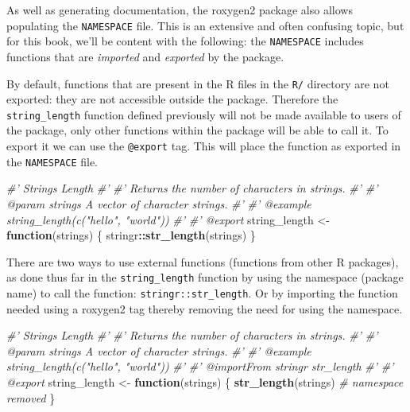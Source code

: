 \documentclass[10pt,]{krantz}
\makeatletter
\newenvironment{Shaded}{\begin{snugshade}}{\end{snugshade}}
\newcommand{\CommentTok}[1]{\textcolor[rgb]{0.37,0.37,0.37}{\textit{#1}}}
\newcommand{\ControlFlowTok}[1]{\textcolor[rgb]{0.27,0.27,0.27}{\textbf{#1}}}
\newcommand{\KeywordTok}[1]{\textcolor[rgb]{0.27,0.27,0.27}{\textbf{#1}}}
\newcommand{\NormalTok}[1]{#1}
\newcommand{\OperatorTok}[1]{\textcolor[rgb]{0.43,0.43,0.43}{\textbf{#1}}}
\newcommand{\StringTok}[1]{\textcolor[rgb]{0.5,0.5,0.5}{#1}}
\newenvironment{kframe}{%
\medskip{}
\setlength{\fboxsep}{.8em}
 \def\at@end@of@kframe{}%
 \ifinner\ifhmode%
  \def\at@end@of@kframe{\end{minipage}}%
  \begin{minipage}{\columnwidth}%
 \fi\fi%
 \def\FrameCommand##1{\hskip\@totalleftmargin \hskip-\fboxsep
 \colorbox{shadecolor}{##1}\hskip-\fboxsep
     \hskip-\linewidth \hskip-\@totalleftmargin \hskip\columnwidth}%
 \MakeFramed {\advance\hsize-\width
   \@totalleftmargin\z@ \linewidth\hsize
   \@setminipage}}%
 {\par\unskip\endMakeFramed%
 \at@end@of@kframe}
\renewenvironment{Shaded}{\begin{kframe}}{\end{kframe}}
\makeatother
\begin{document}
As well as generating documentation, the roxygen2 package also allows populating the \texttt{NAMESPACE} file. This is an extensive and often confusing topic, but for this book, we'll be content with the following: the \texttt{NAMESPACE} includes functions that are \emph{imported} and \emph{exported} by the package.

By default, functions that are present in the R files in the \texttt{R/} directory are not exported: they are not accessible outside the package. Therefore the \texttt{string\_length} function defined previously will not be made available to users of the package, only other functions within the package will be able to call it. To export it we can use the \texttt{@export} tag. This will place the function as exported in the \texttt{NAMESPACE} file.

\begin{Shaded}
\begin{Highlighting}[]
\CommentTok{#' Strings Length}
\CommentTok{#' }
\CommentTok{#' Returns the number of characters in strings. }
\CommentTok{#' }
\CommentTok{#' @param strings A vector of character strings.}
\CommentTok{#' }
\CommentTok{#' @example string_length(c("hello", "world"))}
\CommentTok{#' }
\CommentTok{#' @export}
\NormalTok{string_length <-}\StringTok{ }\ControlFlowTok{function}\NormalTok{(strings) \{}
\NormalTok{  stringr}\OperatorTok{::}\KeywordTok{str_length}\NormalTok{(strings)}
\NormalTok{\}}
\end{Highlighting}
\end{Shaded}

There are two ways to use external functions (functions from other R packages), as done thus far in the \texttt{string\_length} function by using the namespace (package name) to call the function: \texttt{stringr::str\_length}. Or by importing the function needed using a roxygen2 tag thereby removing the need for using the namespace.

\begin{Shaded}
\begin{Highlighting}[]
\CommentTok{#' Strings Length}
\CommentTok{#' }
\CommentTok{#' Returns the number of characters in strings. }
\CommentTok{#' }
\CommentTok{#' @param strings A vector of character strings.}
\CommentTok{#' }
\CommentTok{#' @example string_length(c("hello", "world"))}
\CommentTok{#' }
\CommentTok{#' @importFrom stringr str_length}
\CommentTok{#' }
\CommentTok{#' @export}
\NormalTok{string_length <-}\StringTok{ }\ControlFlowTok{function}\NormalTok{(strings) \{}
  \KeywordTok{str_length}\NormalTok{(strings) }\CommentTok{# namespace removed}
\NormalTok{\}}
\end{Highlighting}
\end{Shaded}
\end{document}

